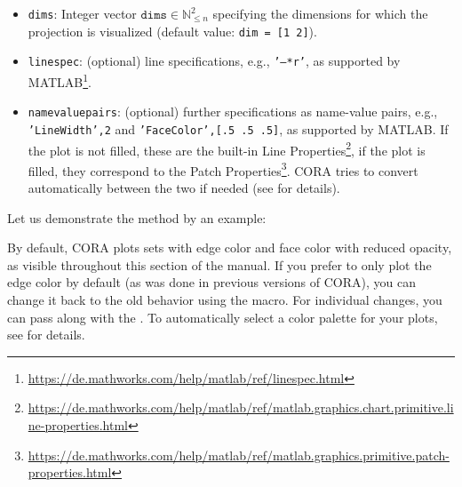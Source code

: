 \begin{itemize}
	\item \texttt{dims}: Integer vector $\texttt{dims} \in \mathbb{N}_{\leq n}^2$ specifying the dimensions for which the projection is visualized (default value: \texttt{dim = [1 2]}).
	\item \texttt{linespec}: (optional) line specifications, e.g., \texttt{'--*r'}, as supported by MATLAB\footnote{\url{https://de.mathworks.com/help/matlab/ref/linespec.html}}.
	\item \texttt{namevaluepairs}: (optional) further specifications as name-value pairs, e.g.,
	\texttt{'LineWidth',2} and \texttt{'FaceColor',[.5 .5 .5]}, as supported by MATLAB.
	If the plot is not filled, these are the built-in
	Line Properties\footnote{\url{https://de.mathworks.com/help/matlab/ref/matlab.graphics.chart.primitive.line-properties.html}},
	if the plot is filled, they correspond to the Patch Properties\footnote{\url{https://de.mathworks.com/help/matlab/ref/matlab.graphics.primitive.patch-properties.html}}.
	CORA tries to convert automatically between the two if needed (see  for details).
\end{itemize}

Let us demonstrate the method   by an example:

\begin{center}
\begin{minipage}[t]{0.40\textwidth}
	\vspace{10pt}
	\footnotesize
	
\end{minipage}
\begin{minipage}[t]{0.3\textwidth}
	\vspace{0pt}
	\centering
\end{minipage}
\end{center}

By default, CORA plots sets with edge color and face color with reduced opacity, as visible throughout this section of the manual.
If you prefer to only plot the edge color by default (as was done in previous versions of CORA),
you can change it back to the old behavior using the  macro.
For individual changes, you can pass  along with the .
To automatically select a color palette for your plots, see  for details.


\vspace{1cm}

